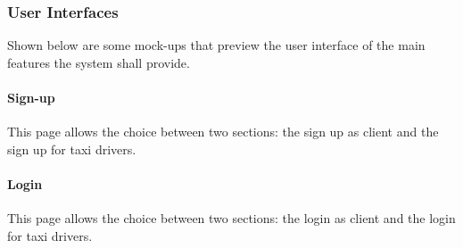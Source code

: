 \documentclass[a4paper,11pt]{report} %
\begin{document}
	\subsubsection{User Interfaces} Shown below are some mock-ups that preview the user interface of the main features the system shall provide.
	
	\paragraph{Sign-up} This page allows the choice between two sections: the sign up as client and the sign up for taxi drivers.
	
	\paragraph{Login} This page allows the choice between two sections: the login as client and the login for taxi drivers.
	
	\pagebreak
	
\end{document}
